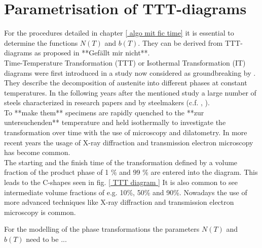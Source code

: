 
\section{Parametrisation of TTT-diagrams}
For the procedures detailed in chapter \ref{ algo mit fic time} it is essential to determine the functions $N(T)$ and $b(T)$. They can be derived from TTT-diagrams as proposed in \cite{tzitzelkov_mathematische_1974} **Gefällt mir nicht**. \\
Time-Temperature Transformation (TTT) or Isothermal Transformation (IT) diagrams were first introduced in a study now considered as groundbreaking by \cite{davenport_transformation_1930}. They describe the decomposition of austenite into different phases at constant temperatures. In the following years after the mentioned study a large number of steels characterized in research papers and by steelmakers (c.f. \cite{vander_voort_atlas_1991}, \cite{us_steel_uss_1963}).\\
To **make them** specimens are rapidly quenched to the **zur untersuchenden** temperature and held isothermally to investigate the transformation over time with the use of microscopy and dilatometry. In more recent years the usage of X-ray diffraction and transmission electron microscopy has become common. \\
The starting and the finish time of the transformation defined by a volume fraction of the product phase of 1 \% and 99 \% are entered into the diagram. This leads to the C-shapes seen in fig. \ref{ TTT diagram } It is also common to see intermediate volume fractions of e.g. 10\%, 50\% and 90\%. 
Nowadays the use of more advanced techniques like X-ray diffraction and transmission electron microscopy is common. 


For the modelling of the phase transformations the parameters $N(T)$ and $b(T)$ need to be  ...

